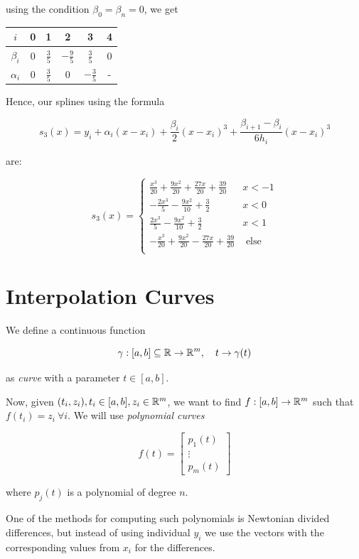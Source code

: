 using the condition \(\beta_0 = \beta_n = 0\), we get 

\begin{center}
\begin{tabular}{c|c|c|c|c|c}
    \(i\)     & 0 & 1 & 2 & 3 & 4\\ \hline
    \(\beta_i\) & 0 & \(\frac{3}{5}\) & \(-\frac{9}{5}\) & \(\frac{3}{5}\) & 0 \\ 
    \(\alpha_i\) & 0 & \(\frac{3}{5}\) & 0 & \(-\frac{3}{5}\) & - 
\end{tabular}
\end{center}

Hence, our splines using the formula 

\[
    s_3(x) = y_i + \alpha_i (x - x_i) + \frac{\beta_i}{2} (x - x_i)^3 + \frac{\beta_{i + 1} - \beta_i}{6h_i}(x - x_i)^3
\]

are: 

\[
    s_3(x) = 
    \begin{cases}
        \frac{x^3}{20} + \frac{9x^2}{20} + \frac{27x}{20} + \frac{39}{20} & x < -1 \\ 
        -\frac{2x^3}{5} - \frac{9x^2}{10} + \frac{3}{2} & x < 0\\ 
        \frac{2x^3}{5} - \frac{9x^2}{10} + \frac{3}{2} & x < 1\\
        -\frac{x^3}{20} + \frac{9x^2}{20} - \frac{27x}{20} + \frac{39}{20} & \text{ else} \\ 
    \end{cases}
\]


\section{Interpolation Curves}

We define a continuous function 

\[
    \gamma: [a, b] \subseteq \mathbb{R}  \to \mathbb{R}^m, \quad t \to \gamma(t)
\]

as \emph{curve} with a parameter \(t \in [a, b]\).

Now, given \((t_i, z_i), t_i \in [a, b], z_i \in \mathbb{R}^m\), we want to find \(f:[a, b] \to \mathbb{R}^m\) such that 
\(f(t_i) = z_i\ \forall i\). We will use \emph{polynomial curves}

\[
    f(t) = 
    \begin{bmatrix}
        p_1(t) \\ 
        \vdots \\ 
        p_m(t)
    \end{bmatrix}
\]

where \(p_j(t)\) is a polynomial of degree \(n\).

One of the methods for computing such polynomials is Newtonian divided differences, but instead of using individual 
\(y_i\) we use the vectors with the corresponding values from \(x_i\) for the differences.


